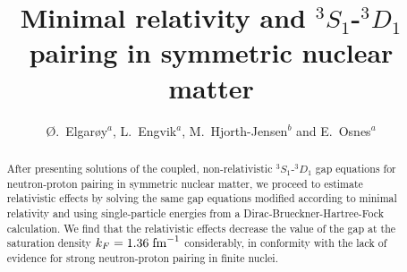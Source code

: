 

\title{Minimal relativity and $^3S_1$-$^3D_1$ pairing in symmetric 
nuclear matter}
 
\author{\O.\ Elgar\o y$^a$, L.\ Engvik$^a$, M.\ Hjorth-Jensen$^b$ and 
E.\ Osnes{$^a$}}

\address{$^a$Department of Physics, University of Oslo, N-0316 Oslo, Norway}

\address{$^b$Nordita, Blegdamsvej 17, DK-2100 K\o benhavn \O, Denmark}

\maketitle

\begin{abstract}
After presenting solutions of the coupled, non-relativistic
 $^3S_1$-$^3D_1$ gap equations for neutron-proton pairing 
in symmetric nuclear matter, 
we proceed to estimate relativistic effects by solving the same 
gap equations modified according to minimal relativity and using 
single-particle energies from a Dirac-Brueckner-Hartree-Fock calculation. 
We find that the relativistic effects decrease the value of the gap 
at the saturation density $k_F=1.36\;{\rm fm}^{-1}$ considerably, 
in conformity with the lack of evidence for strong neutron-proton 
pairing in finite nuclei.  
\end{abstract}

